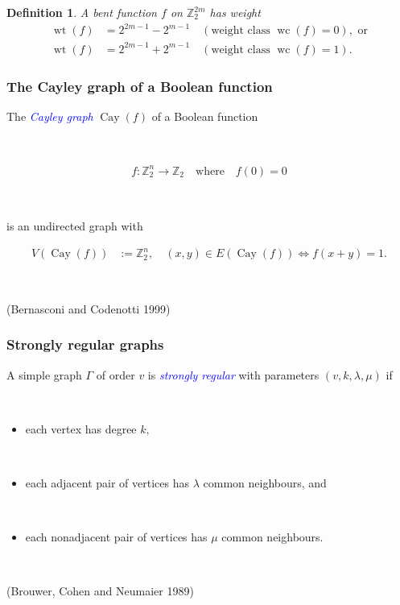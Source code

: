 \documentclass[pdf,sprung,slideColor,nocolorBG]{beamer}
\newenvironment{colortheme}[1]{
\def\ProvidesPackageRCS $##1${\relax}
\renewcommand{\ProcessOptions}{\relax}
\makeatletter

\makeatother
}{}
\newcommand{\slidecite}[1]{\tiny{(#1)}\normalsize{}}
\newcommand{\mb}[1]{\mathbb{#1}}
\newcommand{\Emph}[1]{\emph{\textcolor{blue}{#1}}}
\newcommand{\To}{\rightarrow}
\newcommand{\Cay}[1]{\operatorname{Cay}\left(#1\right)}
\newcommand{\weight}[1]{\operatorname{wt}\left(#1\right)}
\newcommand{\weightclass}[1]{\operatorname{wc}\left(#1\right)}
\newcommand{\Z}{\mb{Z}}
\newtheorem{Def}{Definition}
\begin{document}
\begin{colortheme}{seagull}
\begin{colortheme}{jubata}
\begin{frame}
\begin{Def}
A bent function $f$ on $\Z_2^{2m}$ has weight
\begin{align*}
\weight{f} &= 2^{2 m - 1} - 2^{m-1} \quad (\text{weight class~} \weightclass{f}=0), \text{~or}
\\
\weight{f} &= 2^{2 m - 1} + 2^{m-1} \quad (\text{weight class~} \weightclass{f}=1).
\end{align*}
\end{Def}
\end{frame}
\end{colortheme}

\begin{frame}
\frametitle{The Cayley graph of a Boolean function}
The \Emph{Cayley graph} $\Cay{f}$ of a Boolean function

~

\begin{align*}
%
f : \Z_2^n \To \Z_2 \quad \text{where} \quad f(0) = 0
%
\end{align*}

~

is
an undirected graph with

\begin{align*}
V(\Cay{f}) &:= \Z_2^n, \quad (x,y) \in E(\Cay{f}) \Leftrightarrow f(x+y) = 1.
\end{align*}

~

\slidecite{Bernasconi and Codenotti 1999}
\end{frame}

\begin{frame}
\frametitle{Strongly regular graphs}
A simple graph $\Gamma$ of order $v$ is \Emph{strongly regular} with parameters
$(v,k,\lambda,\mu)$ if

~

\begin{itemize}
 \item
each vertex has degree $k,$

~
 \item
each adjacent pair of vertices has $\lambda$ common neighbours, and

~
\item
each nonadjacent pair of vertices has $\mu$ common neighbours.
\end{itemize}

~

\slidecite{Brouwer, Cohen and Neumaier 1989}


\end{frame}
\end{colortheme}
\end{document}
